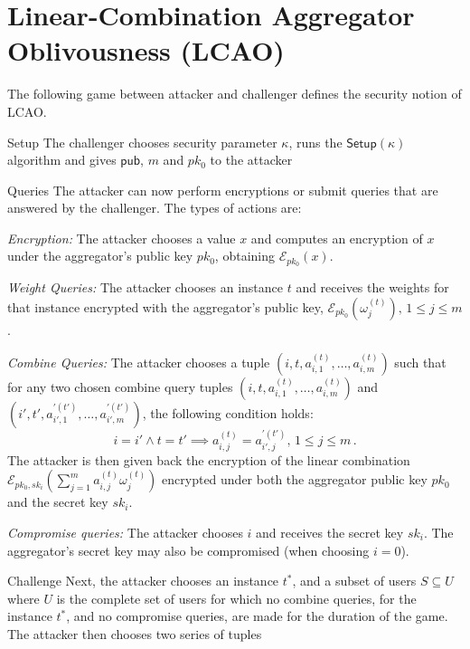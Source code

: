 \documentclass[10pt,letterpaper,oneside,twocolumn,journal]{IEEEtran}
\theoremstyle{definition}
\theoremstyle{definition}
\theoremstyle{remark}
\begin{document}
\section{Linear-Combination Aggregator Oblivousness (LCAO)} \label{app:lcao}
The following game between attacker and challenger defines the security notion of LCAO.
\begin{LaTeXdescription}
    \item[Setup] The challenger chooses security parameter $\kappa$, runs the $\mathsf{Setup}(\kappa)$ algorithm and gives $\mathsf{pub}$, $m$ and $pk_0$ to the attacker
    \item[Queries] The attacker can now perform encryptions or submit queries that are answered by the challenger. The types of actions are:
    \begin{LaTeXenumerate}
        \item \textit{Encryption:} The attacker chooses a value $x$ and computes an encryption of $x$ under the aggregator's public key $pk_0$, obtaining $\mathcal{E}_{pk_0}(x)$.
        \item \textit{Weight Queries:} The attacker chooses an instance $t$ and receives the weights for that instance encrypted with the aggregator's public key, $\mathcal{E}_{pk_0}(\omega^{(t)}_{j}),\,1\leq j\leq m$.
        \item \textit{Combine Queries:} The attacker chooses a tuple $(i,t,a^{(t)}_{i,1},\dots,a^{(t)}_{i,m})$ such that for any two chosen combine query tuples $(i,t,a^{(t)}_{i,1},\dots,a^{(t)}_{i,m})$ and $(i',t',a^{\prime(t')}_{i',1},\dots,a^{\prime(t')}_{i',m})$, the following condition holds:
        \begin{equation*}
            i = i' \wedge t = t' \implies a^{(t)}_{i,j} = a^{\prime(t')}_{i',j},\,1\leq j\leq m\,.
        \end{equation*}
        The attacker is then given back the encryption of the linear combination $\mathcal{E}_{pk_0,sk_i}(\sum^m_{j=1}a^{(t)}_{i,j}\omega^{(t)}_j)$ encrypted under both the aggregator public key $pk_0$ and the secret key $sk_i$.
        \item \textit{Compromise queries:} The attacker chooses $i$ and receives the secret key $sk_i$. The aggregator's secret key may also be compromised (when choosing $i=0$).
    \end{LaTeXenumerate} 
    \item[Challenge] Next, the attacker chooses an instance $t^*$, and a subset of users $S \subseteq U$ where $U$ is the complete set of users for which no combine queries, for the instance $t^*$, and no compromise queries, are made for the duration of the game. The attacker then chooses two series of tuples

\end{LaTeXdescription}
\end{document}
